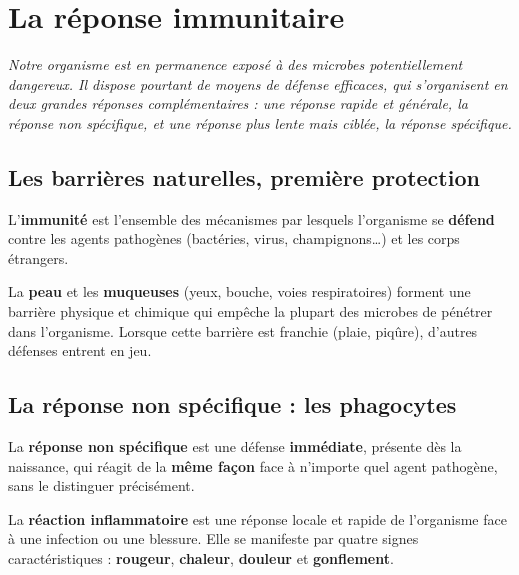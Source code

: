 \chapter{La réponse immunitaire}

\noindent\textit{Notre organisme est en permanence exposé à des microbes
potentiellement dangereux. Il dispose pourtant de moyens de défense efficaces, qui
s'organisent en deux grandes réponses complémentaires : une réponse rapide et
générale, la réponse non spécifique, et une réponse plus lente mais ciblée, la réponse
spécifique.}
\vspace{8pt}

\connecteBanner

\section{Les barrières naturelles, première protection}

\begin{definition}[Immunité]
L'\textbf{immunité} est l'ensemble des mécanismes par lesquels l'organisme se
\textbf{défend} contre les agents pathogènes (bactéries, virus, champignons\dots) et
les corps étrangers.
\end{definition}

\begin{propriete}
La \textbf{peau} et les \textbf{muqueuses} (yeux, bouche, voies respiratoires) forment
une barrière physique et chimique qui empêche la plupart des microbes de pénétrer dans
l'organisme. Lorsque cette barrière est franchie (plaie, piqûre), d'autres défenses
entrent en jeu.
\end{propriete}

\section{La réponse non spécifique : les phagocytes}

\begin{definition}
La \textbf{réponse non spécifique} est une défense \textbf{immédiate}, présente dès la
naissance, qui réagit de la \textbf{même façon} face à n'importe quel agent pathogène,
sans le distinguer précisément.
\end{definition}

\begin{definition}
La \textbf{réaction inflammatoire} est une réponse locale et rapide de l'organisme
face à une infection ou une blessure. Elle se manifeste par quatre signes
caractéristiques : \textbf{rougeur}, \textbf{chaleur}, \textbf{douleur} et
\textbf{gonflement}.
\end{definition}

